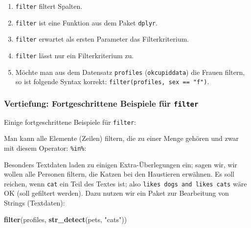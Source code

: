 \documentclass[12pt,ngerman,]{book}
\makeatletter
\newenvironment{Shaded}{\begin{snugshade}}{\end{snugshade}}
\newcommand{\KeywordTok}[1]{\textcolor[rgb]{0.13,0.29,0.53}{\textbf{{#1}}}}
\newcommand{\StringTok}[1]{\textcolor[rgb]{0.31,0.60,0.02}{{#1}}}
\newcommand{\NormalTok}[1]{{#1}}
\providecommand{\tightlist}{%
  \setlength{\itemsep}{0pt}\setlength{\parskip}{0pt}}
\newenvironment{kframe}{%
\medskip{}
\setlength{\fboxsep}{.8em}
 \def\at@end@of@kframe{}%
 \ifinner\ifhmode%
  \def\at@end@of@kframe{\end{minipage}}%
  \begin{minipage}{\columnwidth}%
 \fi\fi%
 \def\FrameCommand##1{\hskip\@totalleftmargin \hskip-\fboxsep
 \colorbox{shadecolor}{##1}\hskip-\fboxsep
     \hskip-\linewidth \hskip-\@totalleftmargin \hskip\columnwidth}%
 \MakeFramed {\advance\hsize-\width
   \@totalleftmargin\z@ \linewidth\hsize
   \@setminipage}}%
 {\par\unskip\endMakeFramed%
 \at@end@of@kframe}
\renewenvironment{Shaded}{\begin{kframe}}{\end{kframe}}
\makeatother
\begin{document}
\begin{enumerate}
\def\labelenumi{\arabic{enumi}.}
\tightlist
\item
  \texttt{filter} filtert Spalten.
\item
  \texttt{filter} ist eine Funktion aus dem Paket \texttt{dplyr}.
\item
  \texttt{filter} erwartet als ersten Parameter das Filterkriterium.
\item
  \texttt{filter} lässt nur ein Filterkriterium zu.
\item
  Möchte man aus dem Datensatz \texttt{profiles} (\texttt{okcupiddata})
  die Frauen filtern, so ist folgende Syntax korrekt:
  \texttt{filter(profiles,\ sex\ ==\ "f")}.
\end{enumerate}

\subsubsection{\texorpdfstring{Vertiefung: Fortgeschrittene Beispiele
für
\texttt{filter}}{Vertiefung: Fortgeschrittene Beispiele für filter}}\label{vertiefung-fortgeschrittene-beispiele-fur-filter}

Einige fortgeschrittene Beispiele für \texttt{filter}:

Man kann alle Elemente (Zeilen) filtern, die zu einer Menge gehören und
zwar mit diesem Operator: \texttt{\%in\%}:

\begin{Shaded}
\end{Shaded}

Besonders Textdaten laden zu einigen Extra-Überlegungen ein; sagen wir,
wir wollen alle Personen filtern, die Katzen bei den Haustieren
erwähnen. Es soll reichen, wenn \texttt{cat} ein Teil des Textes ist;
also \texttt{likes\ dogs\ and\ likes\ cats} wäre OK (soll gefiltert
werden). Dazu nutzen wir ein Paket zur Bearbeitung von Strings
(Textdaten):

\begin{Shaded}
\begin{Highlighting}[]

\KeywordTok{filter}\NormalTok{(profiles, }\KeywordTok{str_detect}\NormalTok{(pets, }\StringTok{"cats"}\NormalTok{))}
\end{Highlighting}
\end{Shaded}
\end{document}
